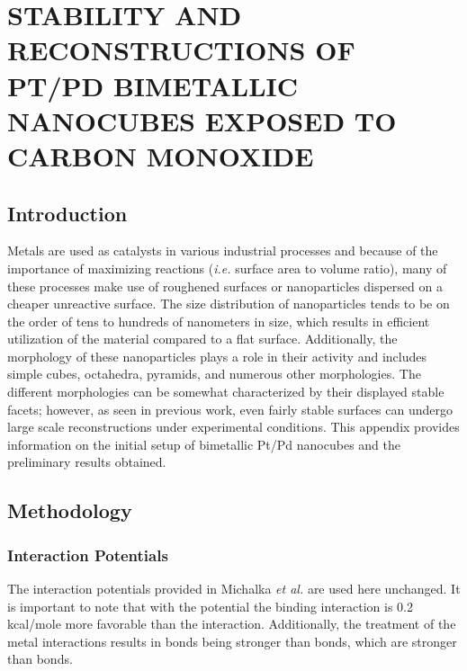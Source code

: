 
\chapter{STABILITY AND RECONSTRUCTIONS OF PT/PD BIMETALLIC NANOCUBES EXPOSED TO CARBON MONOXIDE}

\section{Introduction}

Metals are used as catalysts in various industrial processes and because of the
importance of maximizing reactions ({\em i.e.} surface area to volume ratio),
many of these processes make use of roughened surfaces or nanoparticles
dispersed on a cheaper unreactive surface.\citep{Munnik:2015qf, Graham:2007ng}
The size distribution of nanoparticles tends to be on the order of tens to
hundreds of nanometers in size, which results in efficient utilization of the
material compared to a flat surface.\citep{Zhang:2011ne, Liu:2013hf}
Additionally, the morphology of these nanoparticles plays a role in their
activity and includes simple cubes, octahedra, pyramids, and numerous other
morphologies.\citep{Ahmadi:2015os, Wang:2015qb, Wang:2016dg} The different
morphologies can be somewhat characterized by their displayed stable facets;
however, as seen in previous work\citep{Tao:2010aa, Michalka:2013aa,
Michalka:2015aa, Kim:2016cr}, even fairly stable surfaces can undergo large
scale reconstructions under experimental conditions. This appendix provides
information on the initial setup of bimetallic Pt/Pd nanocubes and the
preliminary results obtained. 

\section{Methodology}
\subsection{Interaction Potentials}
The interaction potentials provided in Michalka {\em et
al.}\citep{Michalka:2015aa} are used here unchanged. It is important to note
that with the potential the  binding interaction is 0.2
kcal/mole more favorable than the  interaction. Additionally,
the treatment of the metal interactions results in  bonds
being stronger than  bonds, which are stronger than
 bonds.

